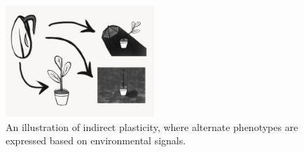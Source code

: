 \begin{figure} 
  \includegraphics[width=0.5\textwidth]{img/plant_developmental_perturbation.jpg}
  \caption{An illustration of indirect plasticity, where alternate phenotypes are expressed based on environmental signals.}
  \label{fig:plant_developmental_perturbation}
\end{figure}
